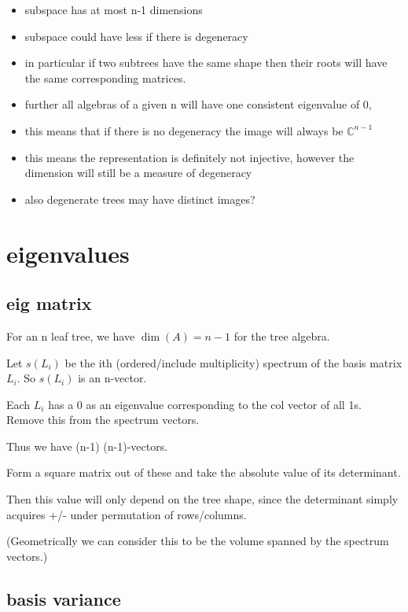 \documentclass{report}
\begin{document}
\begin{itemize}
	\item subspace has at most n-1 dimensions
	\item subspace could have less if there is degeneracy
	\item in particular if two subtrees have the same shape then their roots
		will have the same corresponding matrices.
	\item further all algebras of a given n will have one consistent
		eigenvalue of 0,
	\item this means that if there is no degeneracy the image will always be
		$\mathds{C}^{n-1}$
	\item this means the representation is definitely not injective, however
		the dimension will still be a measure of degeneracy
	\item also degenerate trees may have distinct images?
\end{itemize}

\section{eigenvalues}

\subsection{eig matrix}

For an n leaf tree, we have $\dim(A)=n-1$ for the tree algebra.

Let $s(L_i)$ be the ith (ordered/include multiplicity) spectrum of the basis
matrix $L_i$. So $s(L_i)$ is an n-vector.

Each $L_i$ has a 0 as an eigenvalue corresponding to the col vector of all 1s.
Remove this from the spectrum vectors.

Thus we have (n-1) (n-1)-vectors.

Form a square matrix out of these and take the absolute value of its
determinant.

Then this value will only depend on the tree shape, since the determinant simply acquires +/- under permutation of rows/columns.

(Geometrically we can consider this to be the volume spanned by the spectrum vectors.)



\subsection{basis variance}
\end{document}
